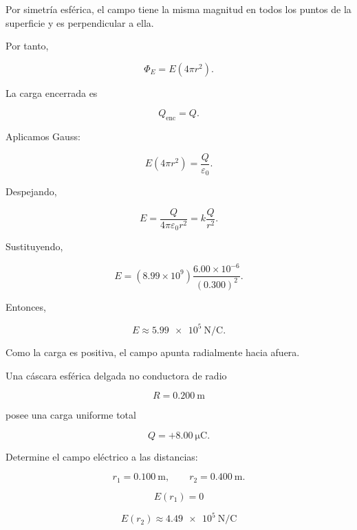 \begin{explicacion}

Por simetría esférica, el campo tiene la misma magnitud en todos los puntos de la
superficie y es perpendicular a ella.

Por tanto,

\[
\Phi_E=E(4\pi r^2).
\]

La carga encerrada es

\[
Q_{\text{enc}}=Q.
\]

Aplicamos Gauss:

\[
E(4\pi r^2)=\frac{Q}{\varepsilon_0}.
\]

Despejando,

\[
E=\frac{Q}{4\pi\varepsilon_0r^2}
=k\frac{Q}{r^2}.
\]

Sustituyendo,

\[
E=(8.99\times10^9)
\frac{6.00\times10^{-6}}{(0.300)^2}.
\]

Entonces,

\[
\boxed{E\approx\SI{5.99e5}{\newton\per\coulomb}}.
\]

Como la carga es positiva, el campo apunta radialmente hacia afuera.

\end{explicacion}


\begin{ejercicio}

Una cáscara esférica delgada no conductora de radio

\[
R=\SI{0.200}{\metre}
\]

posee una carga uniforme total

\[
Q=+\SI{8.00}{\micro\coulomb}.
\]

Determine el campo eléctrico a las distancias:

\[
r_1=\SI{0.100}{\metre},
\qquad
r_2=\SI{0.400}{\metre}.
\]

\end{ejercicio}

\begin{respuesta}

\[
\boxed{E(r_1)=0}
\]

\[
\boxed{E(r_2)\approx\SI{4.49e5}{\newton\per\coulomb}}
\]

\end{respuesta}

